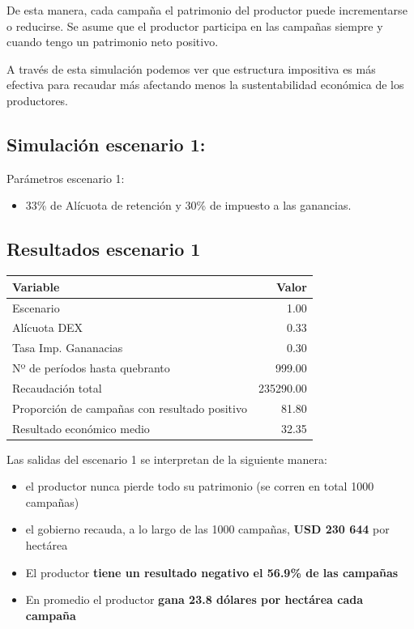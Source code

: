 \documentclass[
  12pt,
  spanish,
  10pt]{article}
\providecommand{\tightlist}{%
  \setlength{\itemsep}{0pt}\setlength{\parskip}{0pt}}
\begin{document}
De esta manera, cada campaña el patrimonio del productor puede
incrementarse o reducirse. Se asume que el productor participa en las
campañas siempre y cuando tengo un patrimonio neto positivo.

A través de esta simulación podemos ver que estructura impositiva es más
efectiva para recaudar más afectando menos la sustentabilidad económica
de los productores.

\hypertarget{simulaciuxf3n-escenario-1}{%
\subsection{Simulación escenario 1:}\label{simulaciuxf3n-escenario-1}}

Parámetros escenario 1:

\begin{itemize}
\tightlist
\item
  33\% de Alícuota de retención y 30\% de impuesto a las ganancias.
\end{itemize}

\hypertarget{resultados-escenario-1}{%
\subsection{Resultados escenario 1}\label{resultados-escenario-1}}

\begin{longtable}[]{@{}lr@{}}
\toprule
Variable & Valor\tabularnewline
\midrule
\endhead
Escenario & 1.00\tabularnewline
Alícuota DEX & 0.33\tabularnewline
Tasa Imp. Gananacias & 0.30\tabularnewline
Nº de períodos hasta quebranto & 999.00\tabularnewline
Recaudación total & 235290.00\tabularnewline
Proporción de campañas con resultado positivo & 81.80\tabularnewline
Resultado económico medio & 32.35\tabularnewline
\bottomrule
\end{longtable}

Las salidas del escenario 1 se interpretan de la siguiente manera:

\begin{itemize}
\tightlist
\item
  el productor nunca pierde todo su patrimonio (se corren en total 1000
  campañas)
\item
  el gobierno recauda, a lo largo de las 1000 campañas, \textbf{USD 230
  644} por hectárea
\item
  El productor \textbf{tiene un resultado negativo el 56.9\% de las
  campañas}
\item
  En promedio el productor \textbf{gana 23.8 dólares por hectárea cada
  campaña}
\end{itemize}
\end{document}
